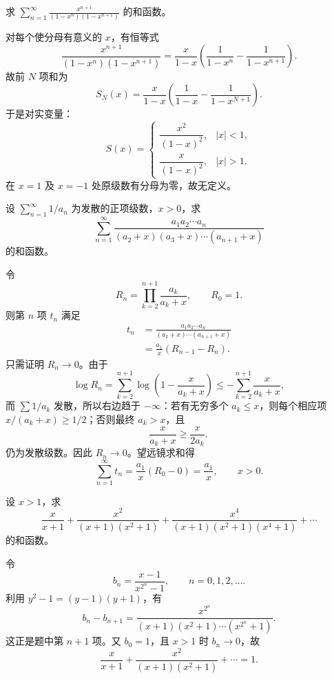 \begin{xexercise}[14]
求 $\displaystyle\sum_{n=1}^{\infty}\frac{x^{n+1}}{(1-x^n)(1-x^{n+1})}$ 的和函数。
\end{xexercise}
\begin{xsolution}
对每个使分母有意义的 $x$，有恒等式
\[
  \frac{x^{n+1}}{(1-x^n)(1-x^{n+1})}
  =\frac{x}{1-x}
  \left(\frac1{1-x^n}-\frac1{1-x^{n+1}}\right).
\]
故前 $N$ 项和为
\[
  S_N(x)=\frac{x}{1-x}
  \left(\frac1{1-x}-\frac1{1-x^{N+1}}\right).
\]
于是对实变量：
\[
  S(x)=
  \begin{cases}
    \dfrac{x^2}{(1-x)^2},&|x|<1,\\[6pt]
    \dfrac{x}{(1-x)^2},&|x|>1.
  \end{cases}
\]
在 $x=1$ 及 $x=-1$ 处原级数有分母为零，故无定义。
\end{xsolution}


\begin{xexercise}[15]
设 $\sum_{n=1}^{\infty}1/a_n$ 为发散的正项级数，$x>0$，求
\[
  \sum_{n=1}^{\infty}\frac{a_1a_2\cdots a_n}{(a_2+x)(a_3+x)\cdots(a_{n+1}+x)}
\]
的和函数。
\end{xexercise}
\begin{xsolution}
令
\[
  R_n=\prod_{k=2}^{n+1}\frac{a_k}{a_k+x},\qquad R_0=1.
\]
则第 $n$ 项 $t_n$ 满足
\[
\begin{aligned}
  t_n
  &=\frac{a_1a_2\cdots a_n}
  {(a_2+x)\cdots(a_{n+1}+x)}\\
  &=\frac{a_1}{x}(R_{n-1}-R_n).
\end{aligned}
\]
只需证明 $R_n\to0$。由于
\[
  \log R_n
  =\sum_{k=2}^{n+1}\log\left(1-\frac{x}{a_k+x}\right)
  \leqslant-\sum_{k=2}^{n+1}\frac{x}{a_k+x},
\]
而 $\sum1/a_k$ 发散，所以右边趋于 $-\infty$：若有无穷多个 $a_k\leqslant x$，则每个相应项 $x/(a_k+x)\geqslant1/2$；否则最终 $a_k>x$，且
\[
  \frac{x}{a_k+x}\geqslant\frac{x}{2a_k},
\]
仍为发散级数。因此 $R_n\to0$。望远镜求和得
\[
  \sum_{n=1}^{\infty}t_n
  =\frac{a_1}{x}(R_0-0)=\frac{a_1}{x},\qquad x>0.
\]
\end{xsolution}


\begin{xexercise}[16]
设 $x>1$，求
\[
  \frac{x}{x+1}+\frac{x^2}{(x+1)(x^2+1)}
  +\frac{x^4}{(x+1)(x^2+1)(x^4+1)}+\cdots
\]
的和函数。
\end{xexercise}
\begin{xsolution}
令
\[
  b_n=\frac{x-1}{x^{2^n}-1},\qquad n=0,1,2,\ldots.
\]
利用 $y^2-1=(y-1)(y+1)$，有
\[
  b_n-b_{n+1}
  =\frac{x^{2^n}}{(x+1)(x^2+1)\cdots(x^{2^n}+1)}.
\]
这正是题中第 $n+1$ 项。又 $b_0=1$，且 $x>1$ 时 $b_n\to0$，故
\[
  \frac{x}{x+1}+\frac{x^2}{(x+1)(x^2+1)}+\cdots=1.
\]
\end{xsolution}


